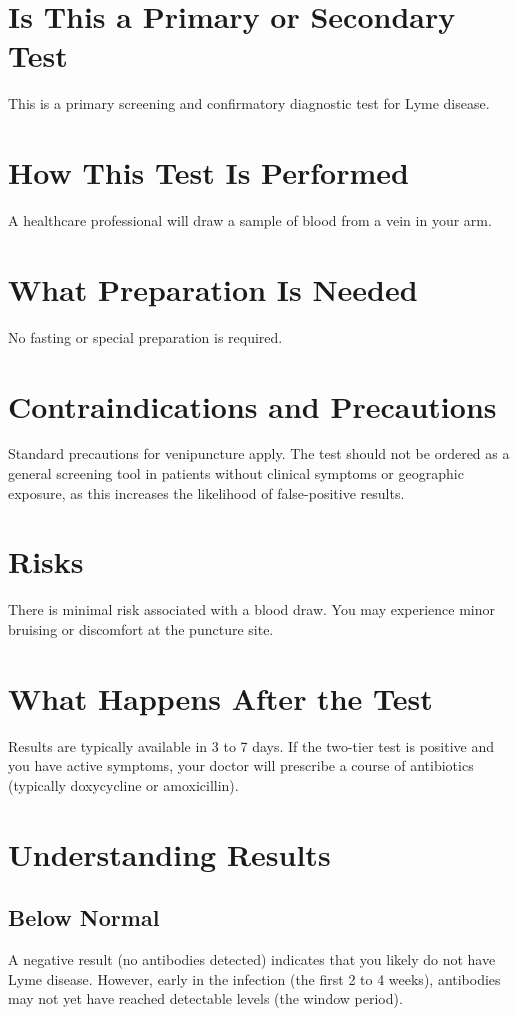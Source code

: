 \section*{Is This a Primary or Secondary Test}
This is a primary screening and confirmatory diagnostic test for Lyme disease.

\section*{How This Test Is Performed}
A healthcare professional will draw a sample of blood from a vein in your arm.

\section*{What Preparation Is Needed}
No fasting or special preparation is required.

\section*{Contraindications and Precautions}
Standard precautions for venipuncture apply. The test should not be ordered as a general screening tool in patients without clinical symptoms or geographic exposure, as this increases the likelihood of false-positive results.

\section*{Risks}
There is minimal risk associated with a blood draw. You may experience minor bruising or discomfort at the puncture site.

\section*{What Happens After the Test}
Results are typically available in 3 to 7 days. If the two-tier test is positive and you have active symptoms, your doctor will prescribe a course of antibiotics (typically doxycycline or amoxicillin).

\section*{Understanding Results}

\subsection*{Below Normal}
A negative result (no antibodies detected) indicates that you likely do not have Lyme disease. However, early in the infection (the first 2 to 4 weeks), antibodies may not yet have reached detectable levels (the window period).

